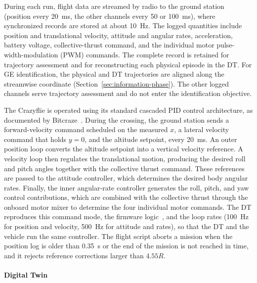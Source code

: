 \documentclass[journal]{IEEEtran}
\begin{document}
During each run, flight data are streamed by radio to the ground station (position every 20~ms, the other channels every 50 or 100~ms), where synchronized records are stored at about 10~Hz. The logged quantities include position and translational velocity, attitude and angular rates, acceleration, battery voltage, collective-thrust command, and the individual motor pulse-width-modulation (PWM) commands. The complete record is retained for trajectory assessment and for reconstructing each physical episode in the DT. For GE identification, the physical and DT trajectories are aligned along the streamwise coordinate (Section~\ref{sec:information-phase}). The other logged channels serve trajectory assessment and do not enter the identification objective.

The Crazyflie is operated using its standard cascaded PID control architecture, as documented by Bitcraze~\cite{BitcrazeControllers}. During the crossing, the ground station sends a forward-velocity command scheduled on the measured $x$, a lateral velocity command that holds $y=0$, and the altitude setpoint, every 20~ms. An outer position loop converts the altitude setpoint into a vertical velocity reference. A velocity loop then regulates the translational motion, producing the desired roll and pitch angles together with the collective thrust command. These references are passed to the attitude controller, which determines the desired body angular rates. Finally, the inner angular-rate controller generates the roll, pitch, and yaw control contributions, which are combined with the collective thrust through the onboard motor mixer to determine the four individual motor commands. The DT reproduces this command mode, the firmware logic~\cite{BitcrazeFirmware}, and the loop rates (100~Hz for position and velocity, 500~Hz for attitude and rates), so that the DT and the vehicle run the same controller. The flight script aborts a mission when the position log is older than 0.35~s or the end of the mission is not reached in time, and it rejects reference corrections larger than $4.55R$.

\paragraph*{Digital Twin}
\label{sec:digital_twin}
\end{document}
